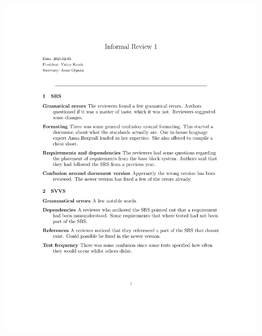 \documentclass{article}
\begin{document}
\begin{figure}
     \centering
     \includegraphics[width=13cm]{images/Phase1_2021_02_03-1}
     \renewcommand\figurename{Figure}
     \label{fig:my_label}
 \end{figure}
 
\end{document}
